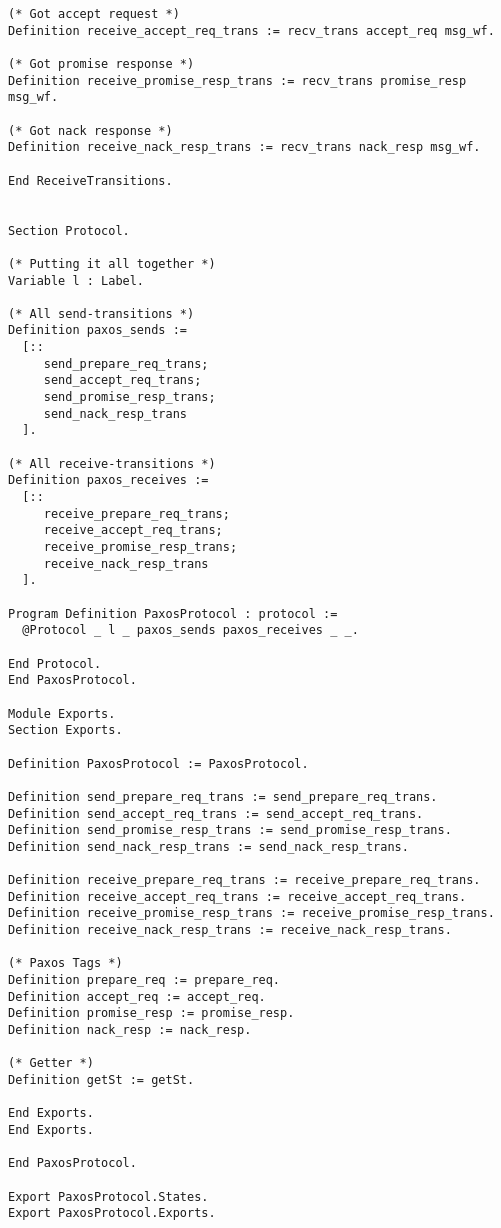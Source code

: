 \begin{landscape}
\begin{multicols*}{2}
\begin{lstlisting}[style=SourceCodeListing]
(* Got accept request *)
Definition receive_accept_req_trans := recv_trans accept_req msg_wf.

(* Got promise response *)
Definition receive_promise_resp_trans := recv_trans promise_resp msg_wf.

(* Got nack response *)
Definition receive_nack_resp_trans := recv_trans nack_resp msg_wf.

End ReceiveTransitions.


Section Protocol.

(* Putting it all together *)
Variable l : Label.

(* All send-transitions *)
Definition paxos_sends :=
  [::
     send_prepare_req_trans;
     send_accept_req_trans;
     send_promise_resp_trans;
     send_nack_resp_trans
  ].

(* All receive-transitions *)
Definition paxos_receives :=
  [::
     receive_prepare_req_trans;
     receive_accept_req_trans;
     receive_promise_resp_trans;
     receive_nack_resp_trans
  ].

Program Definition PaxosProtocol : protocol :=
  @Protocol _ l _ paxos_sends paxos_receives _ _.

End Protocol.
End PaxosProtocol.

Module Exports.
Section Exports.

Definition PaxosProtocol := PaxosProtocol.

Definition send_prepare_req_trans := send_prepare_req_trans.
Definition send_accept_req_trans := send_accept_req_trans.
Definition send_promise_resp_trans := send_promise_resp_trans.
Definition send_nack_resp_trans := send_nack_resp_trans.

Definition receive_prepare_req_trans := receive_prepare_req_trans.
Definition receive_accept_req_trans := receive_accept_req_trans.
Definition receive_promise_resp_trans := receive_promise_resp_trans.
Definition receive_nack_resp_trans := receive_nack_resp_trans.

(* Paxos Tags *)
Definition prepare_req := prepare_req.
Definition accept_req := accept_req.
Definition promise_resp := promise_resp.
Definition nack_resp := nack_resp.

(* Getter *)
Definition getSt := getSt.

End Exports.
End Exports.

End PaxosProtocol.

Export PaxosProtocol.States.
Export PaxosProtocol.Exports.
\end{lstlisting}
\end{multicols*}


\end{landscape}
